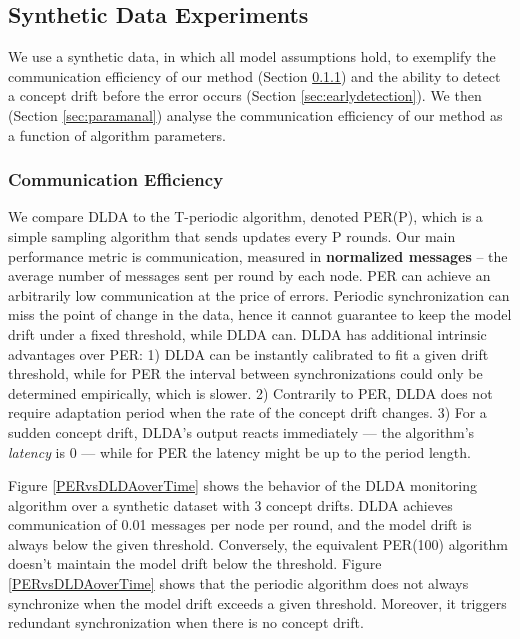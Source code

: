 \documentclass{sig-alternate-05-2015}
\begin{document}
\subsection{Synthetic Data Experiments}
We use a synthetic data, in which all model assumptions hold, to
exemplify the communication efficiency of our method (Section \ref{sec:com_eff}) and the ability to detect a concept drift before the error occurs (Section \ref{sec:earlydetection}). We then (Section \ref{sec:paramanal}) analyse the communication efficiency of our method as a function of algorithm parameters.

\subsubsection{Communication Efficiency}\label{sec:com_eff}
We compare DLDA to the T-periodic algorithm, denoted
PER(P), which is a simple sampling algorithm that sends updates
every P rounds.
Our main performance metric is communication, measured
in \textbf{normalized messages} -- the average number of messages sent per
round by each node. PER can achieve an arbitrarily low communication at the price of errors. Periodic synchronization can miss the point of change in the data, hence it cannot guarantee to keep the model drift under a fixed threshold, while DLDA can.  DLDA has additional intrinsic advantages over PER: 1) DLDA can be instantly calibrated to fit a given drift threshold, while for PER the interval between synchronizations could only be determined empirically, which is slower. 2) Contrarily to PER, DLDA does not require adaptation period when the rate of the concept drift changes. 3) For a sudden concept drift, DLDA's output reacts immediately --- the algorithm's \textit{latency} is 0 --- while for PER the latency might be up to the period length.
	
Figure \ref{PERvsDLDAoverTime} shows the behavior of the DLDA monitoring
algorithm over a synthetic dataset with 3 concept drifts.
DLDA achieves communication of 0.01 messages per node per round, and
the model drift is always below the given threshold.
Conversely, the equivalent PER(100) algorithm doesn't maintain the
model drift below the threshold.
Figure \ref{PERvsDLDAoverTime} shows that the periodic algorithm does not always  synchronize when the model drift exceeds a given threshold. Moreover, it  triggers redundant synchronization when there is no concept drift.
\end{document}
